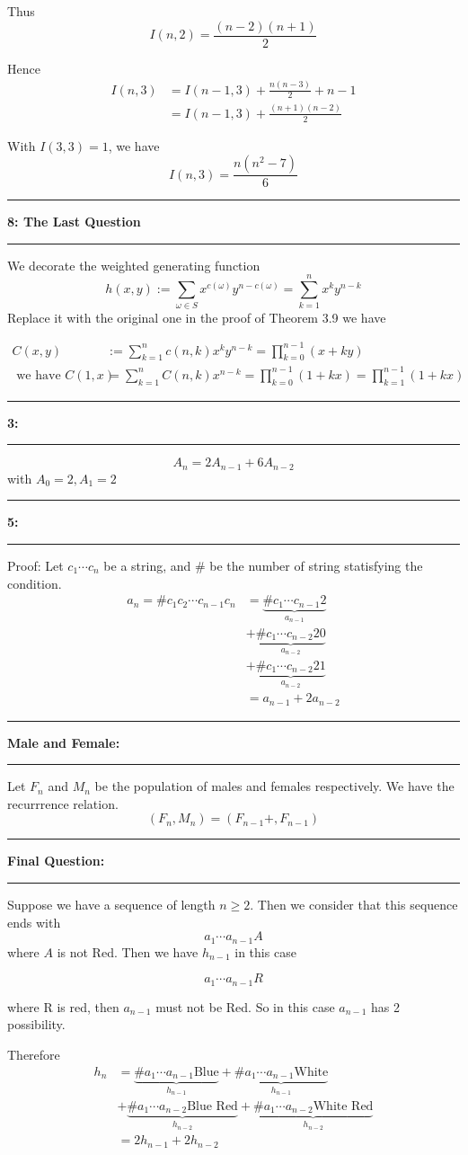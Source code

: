 \documentclass[11pt]{article}
\newcommand\question[2]{\vspace{.25in}\hrule\textbf{#1: #2}\vspace{.5em}\hrule\vspace{.10in}}
\newcommand{\sumn}{\sum_{k=1}^{n}}
\begin{document}
Thus \[I(n, 2) = \frac{(n - 2)(n + 1)}{2}\]

Hence
\begin{align*}
    I(n, 3) &= I(n - 1, 3) + \frac{n(n - 3)}{2} + n - 1 \\
            &= I(n - 1, 3) + \frac{(n+1)(n-2)}{2}
\end{align*}

With $I(3,3) = 1$, we have
\[I(n, 3) = \frac{n(n^2-7)}{6}\]
\question{8}{The Last Question}
We decorate the weighted generating function
\[h(x, y) := \sum_{\omega \in S} x^{c(\omega)}y^{n-c(\omega)} = \sumn x^ky^{n-k} \]
Replace it with the original one in the proof of Theorem 3.9 we have

\begin{align*}
    C(x, y) &:= \sumn c(n,k)x^{k}y^{n-k} = \prod_{k=0}^{n-1}(x+ky)\\
    \text{ we have } C(1, x) &= \sumn C(n, k)x^{n-k} = \prod_{k=0}^{n-1}(1+kx) = \prod_{k=1}^{n-1}(1+kx) 
\end{align*}

\question{3}{}
\[A_{n} = 2A_{n - 1} + 6A_{n - 2}\]
with $A_{0} = 2, A_{1} = 2$

\question{5}{}
Proof:
Let $c_1\cdots c_n$ be a string, and $\#$ be the number of string statisfying the condition.
\begin{align*}
   a_{n} = \#c_1c_2\cdots c_{n-1}c_n &= \underbrace{\#c_{1}\cdots c_{n-1}2}_{a_{n-1}} \\
                              &+ \underbrace{\#c_1\cdots c_{n-2} 20}_{a_{n-2}} \\
                              &+ \underbrace{\#c_1\cdots c_{n-2} 21}_{a_{n-2}} \\
                              &= a_{n-1} + 2a_{n-2}
\end{align*}

\question{Male and Female}{}

Let $F_n$ and $M_n$ be the population of males and females respectively.
We have the recurrrence relation.
\[(F_{n}, M_{n}) = (F_{n - 1} + , F_{n - 1})\]

\question{Final Question}{}
Suppose we have a sequence of length $n \ge 2$.
Then we consider that this sequence ends with
\[a_1\cdots a_{n-1}A\]
where $A $ is not Red. Then we have $h_{n - 1}$ in this case

\[a_1\cdots a_{n-1}R\] 

where R is red, then $a_{n-1}$ must not be Red. So in this case $a_{n-1}$ has 2 possibility.

Therefore
\begin{align*}
    h_{n} &= \underbrace{\#a_1\cdots a_{n-1}\text{Blue}}_{h_{n-1}} + \underbrace{\#a_1\cdots a_{n-1}\text{White}}_{h_{n-1}} \\
          &+ \underbrace{\#a_1\cdots a_{n-2}\text{Blue Red}}_{h_{n-2}} + \underbrace{\#a_1\cdots a_{n-2}\text{White Red}}_{h_{n-2}} \\
          &= 2h_{n-1} + 2h_{n-2}
\end{align*}
\end{document}
